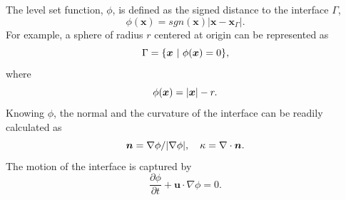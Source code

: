 \begin{frame}[t]
\begin{columns}[T]
\begin{column}{0.5\textwidth}
{\begin{bluecolorbox}
        The level set function, $\phi$, is defined as the signed distance to the interface $\Gamma$,
        \begin{equation} 
          \phi({\bm x}) = sgn({\bm x}) |{\bm x}-{\bm x}_\Gamma|.
        \end{equation}
        For example, a sphere of radius $r$ centered at origin can be represented as
        \begin{equation} \notag
          \Gamma = \{ {\bm x} ~ \rvert ~ \phi({\bm x}) = 0 \},
        \end{equation}
        where
        \begin{equation} \notag
          \phi({\bm x}) = |{\bm x}| -r.
        \end{equation}
        Knowing $\phi$, the normal and the curvature of the interface can be readily calculated as
        \begin{equation}
          {\bm n} = \nabla \phi / \lvert \nabla \phi \rvert, \quad \kappa = \nabla \cdot {\bm n}.
        \end{equation}
        The motion of the interface is captured by
        \begin{equation} \label{eq:ls-avd}
          \frac{\partial \phi}{\partial t} + \bm{u} \cdot \nabla \phi = 0.
        \end{equation}
        
      \end{bluecolorbox}
      } %
    \end{column}
    
  \end{columns}

\end{frame}
